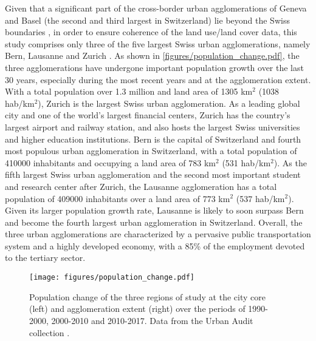 Given that a significant part of the cross-border urban agglomerations of Geneva and Basel (the second and third largest in Switzerland) lie beyond the Swiss boundaries , in order to ensure coherence of the land use/land cover data, this study comprises only three of the five largest Swiss urban agglomerations, namely Bern, Lausanne and Zurich .
As shown in \autoref{figures/population_change.pdf}, the three agglomerations have undergone important population growth over the last 30 years, especially during the most recent years and at the agglomeration extent.
With a total population over 1.3 million and land area of 1305 km$^2$ (1038 hab/km$^2$), Zurich is the largest Swiss urban agglomeration. As a leading global city and one of the world's largest financial centers, Zurich has the country's largest airport and railway station, and also hosts the largest Swiss universities and higher education institutions. 
Bern is the capital of Switzerland and fourth most populous urban agglomeration in Switzerland, with a total population of 410000 inhabitants and occupying a land area of 783 km$^2$ (531 hab/km$^2$). As the fifth largest Swiss urban agglomeration and the second most important student and research center after Zurich, the Lausanne agglomeration has a total population of 409000 inhabitants over a land area of 773 km$^2$ (537 hab/km$^2$). Given its larger population growth rate, Lausanne is likely to soon surpass Bern and become the fourth largest urban agglomeration in Switzerland.
Overall, the three urban agglomerations are characterized by a pervasive public transportation system and a highly developed economy, with a 85\% of the employment devoted to the tertiary sector.

\begin{figure}[!ht]
    \centering  
    \texttt{[image: figures/population\_change.pdf]}
    \vspace{.5em}
    \caption[Population change]{\label{figures/population_change.pdf}Population change of the three regions of study at the city core (left) and agglomeration extent (right) over the periods of 1990-2000, 2000-2010 and 2010-2017. Data from the Urban Audit collection .}
\end{figure}


